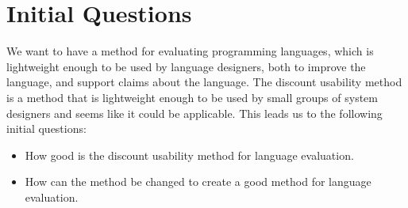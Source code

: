 \section{Initial Questions}
We want to have a method for evaluating programming languages, which is lightweight enough to be used by language designers, both to improve the language, and support claims about the language.
The discount usability method is a method that is lightweight enough to be used by small groups of system designers and seems like it could be applicable.
This leads us to the following initial questions:

\begin{itemize}
\item How good is the discount usability method for language evaluation.
\item How can the method be changed to create a good method for language evaluation.
\end{itemize}
